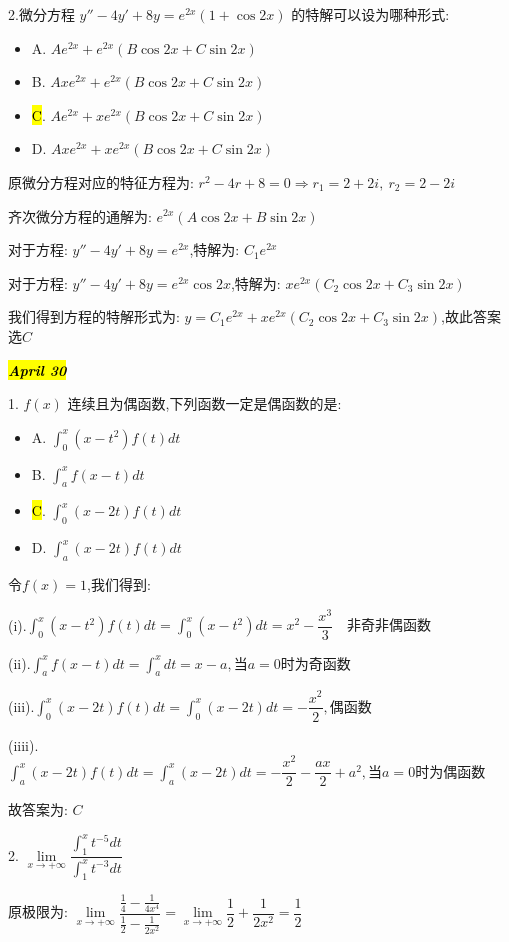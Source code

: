 2.微分方程 $y''-4y'+8y=e^{2x}(1+\cos 2x)$ 的特解可以设为哪种形式: 
\begin{itemize}
	\item A. $Ae^{2x}+e^{2x}(B\cos 2x+C\sin 2x)$ 
	\item B. $Axe^{2x}+e^{2x}(B\cos 2x+C\sin 2x)$ 
	\item \hl{C}. $Ae^{2x}+xe^{2x}(B\cos 2x+C\sin 2x)$ 
	\item D. $Axe^{2x}+xe^{2x}(B\cos 2x+C\sin 2x)$ 
\end{itemize}
\begin{solution}
	
	原微分方程对应的特征方程为: $r^2-4r+8=0\Rightarrow r_{1}=2+2i,\ r_{2}=2-2i$
	
	齐次微分方程的通解为: $e^{2x}(A\cos 2x+B\sin 2x)$
	
	对于方程: $y''-4y'+8y=e^{2x}$,特解为: $C_{1}e^{2x}$
	
	对于方程: $y''-4y'+8y=e^{2x}\cos 2x$,特解为: $xe^{2x}(C_{2}\cos 2x+C_{3}\sin 2x)$
	
	我们得到方程的特解形式为: $y=C_{1}e^{2x}+xe^{2x}(C_{2}\cos 2x+C_{3}\sin 2x)$,故此答案选$C$
\end{solution}

\hl{\textbf{\textit{April 30}}}

1. $f(x)$ 连续且为偶函数,下列函数一定是偶函数的是: 
\begin{itemize}
	\item A. $\int_{0}^{x}(x-t^2)f(t)dt$ 
	\item B. $\int_{a}^{x}f(x-t)dt$ 
	\item \hl{C}. $\int_{0}^{x}(x-2t)f(t)dt$ 
	\item D. $\int_{a}^{x}(x-2t)f(t)dt$ 
\end{itemize}
\begin{solution}
	
	令$f(x)=1$,我们得到: 
	
	(i).$\int_{0}^{x}(x-t^2)f(t)dt=\int_{0}^{x}(x-t^2)dt=x^2-\dfrac{x^3}{3}\quad \text{非奇非偶函数}$
	
	(ii).$\int_{a}^{x}f(x-t)dt=\int_{a}^{x}dt=x-a,\text{当}a=0\text{时为奇函数}$
	
	(iii).$\int_{0}^{x}(x-2t)f(t)dt=\int_{0}^{x}(x-2t)dt=-\dfrac{x^2}{2},\text{偶函数}$
	
	(iiii). $\int_{a}^{x}(x-2t)f(t)dt=\int_{a}^{x}(x-2t)dt=-\dfrac{x^2}{2}-\dfrac{ax}{2}+a^2,\text{当}a=0\text{时为偶函数}$
	
	故答案为: $C$
\end{solution}

2. $\lim\limits_{x\rightarrow +\infty}\dfrac{\int_{1}^{x}t^{-5}dt}{\int_{1}^{x}t^{-3}dt}$
\begin{solution}
	
	原极限为: $\lim\limits_{x\rightarrow +\infty}\dfrac{\frac{1}{4}-\frac{1}{4x^4}}{\frac{1}{2}-\frac{1}{2x^2}}=\lim\limits_{x\rightarrow +\infty}\dfrac{1}{2}+\dfrac{1}{2x^2}=\dfrac{1}{2}$
\end{solution}